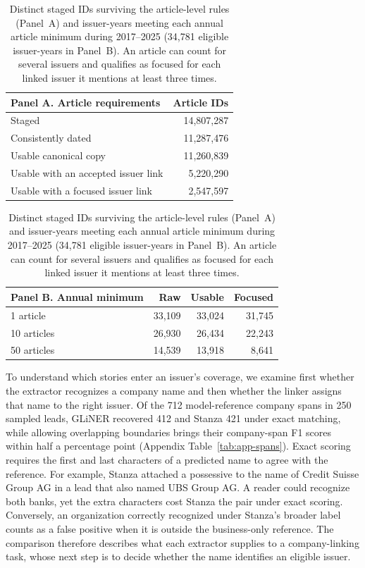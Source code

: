 \begin{table}[t]
  \centering
  \small
  \begin{tabular}{@{}lr@{}}
    \toprule
    Panel A. Article requirements & Article IDs \\
    \midrule
    Staged & 14,807,287 \\
    Consistently dated & 11,287,476 \\
    Usable canonical copy & 11,260,839 \\
    Usable with an accepted issuer link & 5,220,290 \\
    Usable with a focused issuer link & 2,547,597 \\
    \bottomrule
  \end{tabular}

  \smallskip
  \begin{tabular}{@{}lrrr@{}}
    \toprule
    Panel B. Annual minimum & Raw & Usable & Focused \\
    \midrule
    1 article & 33,109 & 33,024 & 31,745 \\
    10 articles & 26,930 & 26,434 & 22,243 \\
    50 articles & 14,539 & 13,918 & 8,641 \\
    \bottomrule
  \end{tabular}
  \caption{Distinct staged IDs surviving the article-level rules
    (Panel~A) and issuer-years meeting each annual article minimum
    during 2017--2025 (34,781 eligible issuer-years in Panel~B). An
    article can count for several issuers
    and qualifies as focused for each linked issuer it mentions at least
  three times.}
  \label{tab:coverage}
\end{table}

To understand which stories enter an issuer's coverage, we examine
first whether the extractor recognizes a company name and then whether
the linker assigns that name to the right issuer. Of the 712
model-reference company spans in 250 sampled leads, GLiNER recovered 412
and Stanza 421 under exact matching, while allowing overlapping boundaries
brings their company-span F1 scores within half a percentage point
(Appendix Table~\ref{tab:app-spans}). Exact scoring requires the first
and last characters of a predicted name to agree with the reference.
For example, Stanza attached a possessive to the name of Credit Suisse
Group AG in a lead that also named UBS Group AG. A reader could
recognize both banks, yet the extra characters cost Stanza the pair
under exact scoring. Conversely, an organization correctly recognized
under Stanza's broader label counts as a false positive when it is
outside the business-only reference. The comparison therefore describes
what each extractor supplies to a company-linking task, whose next
step is to decide whether the name identifies an eligible issuer.

